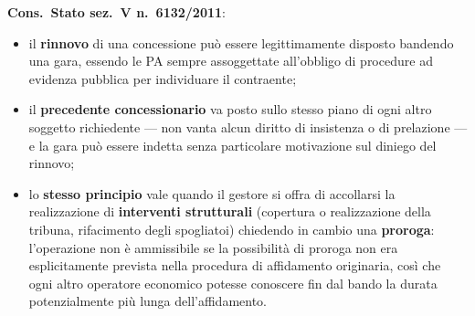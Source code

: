 
\textbf{Cons.\ Stato sez.\ V n.\ 6132/2011}:

\begin{itemize}
  \item il \textbf{rinnovo} di una concessione può essere legittimamente disposto bandendo una
    gara, essendo le PA sempre assoggettate all'obbligo di procedure ad evidenza pubblica per
    individuare il contraente;
  \item il \textbf{precedente concessionario} va posto sullo stesso piano di ogni altro soggetto
    richiedente --- non vanta alcun diritto di insistenza o di prelazione --- e la gara può essere
    indetta senza particolare motivazione sul diniego del rinnovo;
  \item lo \textbf{stesso principio} vale quando il gestore si offra di accollarsi la
    realizzazione di \textbf{interventi strutturali} (copertura o realizzazione della tribuna,
    rifacimento degli spogliatoi) chiedendo in cambio una \textbf{proroga}: l'operazione non è
    ammissibile se la possibilità di proroga non era esplicitamente prevista nella procedura di
    affidamento originaria, così che ogni altro operatore economico potesse conoscere fin dal
    bando la durata potenzialmente più lunga dell'affidamento.
\end{itemize}
